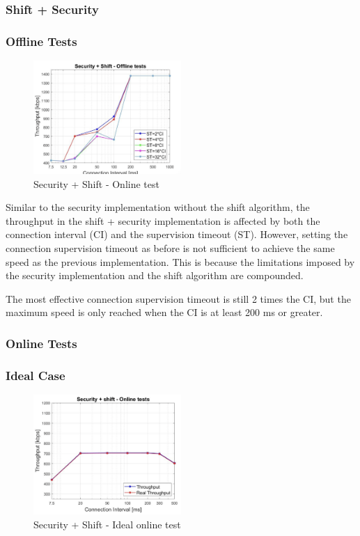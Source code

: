 \documentclass{Configuration_Files/PoliMi3i_thesis}
\begin{document}
\subsubsection*{Shift + Security}
\subsubsection*{Offline Tests}

\begin{figure}[H]
    \centering
    \includegraphics[width=0.5\textwidth]{Results Manuel/figure22}
    \caption{Security + Shift - Online test}
    \label{manuel_results_22}
\end{figure}

Similar to the security implementation without the shift algorithm, the throughput in the shift + security implementation is affected by both the connection interval (CI) and the supervision timeout (ST). However, setting the connection supervision timeout as before is not sufficient to achieve the same speed as the previous implementation. This is because the limitations imposed by the security implementation and the shift algorithm are compounded.

The most effective connection supervision timeout is still 2 times the CI, but the maximum speed is only reached when the CI is at least 200 ms or greater.

\subsubsection*{Online Tests}
\subsubsection*{Ideal Case}

\begin{figure}[H]
    \centering
    \includegraphics[width=0.5\textwidth]{Results Manuel/figure23}
    \caption{Security + Shift - Ideal online test}
    \label{manuel_results_23}
\end{figure}
\end{document}
